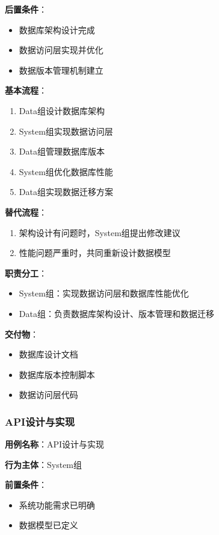 \documentclass[a4paper,12pt]{article}
\begin{document}
\textbf{后置条件}：
\begin{itemize}
  \item 数据库架构设计完成
  \item 数据访问层实现并优化
  \item 数据版本管理机制建立
\end{itemize}

\textbf{基本流程}：
\begin{enumerate}
  \item Data组设计数据库架构
  \item System组实现数据访问层
  \item Data组管理数据库版本
  \item System组优化数据库性能
  \item Data组实现数据迁移方案
\end{enumerate}

\textbf{替代流程}：
\begin{enumerate}
  \item 架构设计有问题时，System组提出修改建议
  \item 性能问题严重时，共同重新设计数据模型
\end{enumerate}

\textbf{职责分工}：
\begin{itemize}
  \item System组：实现数据访问层和数据库性能优化
  \item Data组：负责数据库架构设计、版本管理和数据迁移
\end{itemize}

\textbf{交付物}：
\begin{itemize}
  \item 数据库设计文档
  \item 数据库版本控制脚本
  \item 数据访问层代码
\end{itemize}

\subsubsection{API设计与实现}

\textbf{用例名称}：API设计与实现

\textbf{行为主体}：System组

\textbf{前置条件}：
\begin{itemize}
  \item 系统功能需求已明确
  \item 数据模型已定义
\end{itemize}
\end{document}
